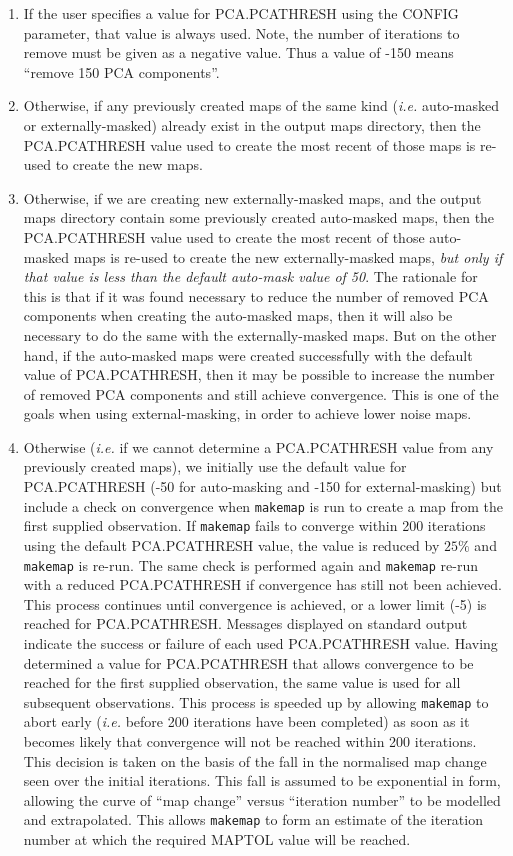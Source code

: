 \documentclass[twoside,11pt]{starlink}
\begin{document}
\begin{enumerate}
\item If the user specifies a value for PCA.PCATHRESH using the CONFIG
parameter, that value is always used. Note, the number of iterations to
remove must be given as a negative value. Thus a value of -150 means
``remove 150 PCA components''.
\item Otherwise, if any previously created maps of the same kind (\emph{i.e.}
auto-masked or externally-masked) already exist in the output maps directory,
then the PCA.PCATHRESH value used to create the most recent of those maps is
re-used to create the new maps.
\item Otherwise, if we are creating new externally-masked maps, and the
output maps directory contain some previously created auto-masked maps,
then the PCA.PCATHRESH value used to create the most recent of those
auto-masked maps is re-used to create the new externally-masked maps,
\emph{but only if that value is less than the default auto-mask value of
50}. The rationale for this is that if it was found necessary to reduce
the number of removed PCA components when creating the auto-masked maps,
then it will also be necessary to do the same with the externally-masked
maps. But on the other hand, if the auto-masked maps were created successfully with the default
value of PCA.PCATHRESH, then it may be possible to increase the number of
removed PCA components and still achieve convergence. This is one of the
goals when using external-masking, in order to achieve lower noise maps.
\item Otherwise (\emph{i.e.} if we cannot determine a PCA.PCATHRESH value
from any previously created maps), we initially use the default value for
PCA.PCATHRESH (-50 for auto-masking and -150 for external-masking) but
include a check on convergence when \texttt{makemap} is run to create a
map from the first supplied observation. If \texttt{makemap} fails to
converge within 200 iterations using the default PCA.PCATHRESH value, the
value is reduced by $25\%$ and \texttt{makemap} is re-run. The same check
is performed again and \texttt{makemap} re-run with a reduced
PCA.PCATHRESH if convergence has still not been achieved. This process
continues until convergence is achieved, or a lower limit (-5) is reached
for PCA.PCATHRESH. Messages displayed on standard output indicate the
success or failure of each used PCA.PCATHRESH value. Having determined a
value for PCA.PCATHRESH that allows convergence to be reached for the
first supplied observation, the same value is used for all subsequent
observations. This process is speeded up by allowing \texttt{makemap} to
abort early (\emph{i.e.} before 200 iterations have been completed) as
soon as it becomes likely that convergence will not be reached within 200
iterations. This decision is taken on the basis of the fall in the
normalised map change seen over the initial iterations. This fall is
assumed to be exponential in form, allowing the curve of ``map change''
versus ``iteration number'' to be modelled and extrapolated. This allows
\texttt{makemap} to form an estimate of the iteration number at which the
required MAPTOL value will be reached.
\end{enumerate}
\end{document}
